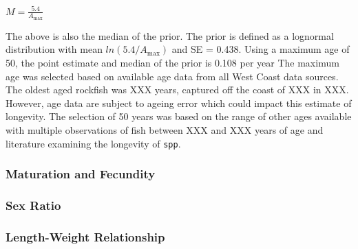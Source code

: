 \documentclass[11pt,
  english,
  a4paper,
]{article}
\begin{document}
\leavevmode\tagmcend\tagstructend\par

\begin{centering}

$M=\frac{5.4}{A_{\text{max}}}$

\end{centering}


The above is also the median of the prior. The prior is defined as a lognormal distribution with mean {\(ln(5.4/A_{\text{max}})\)\leavevmode\tagmcend\tagstructend} and SE = 0.438. Using a maximum age of 50, the point estimate and median of the prior is 0.108 per year The maximum age was selected based on available age data from all West Coast data sources. The oldest aged rockfish was XXX years, captured off the coast of XXX in XXX. However, age data are subject to ageing error which could impact this estimate of longevity. The selection of 50 years was based on the range of other ages available with multiple observations of fish between XXX and XXX years of age and literature examining the longevity of \texttt{spp}.

\leavevmode\tagmcend\tagstructend\par


\hypertarget{maturation-and-fecundity}{%
\subsubsection{Maturation and Fecundity}\label{maturation-and-fecundity}}

\leavevmode\tagmcend\tagstructend


\hypertarget{sex-ratio}{%
\subsubsection{Sex Ratio}\label{sex-ratio}}

\leavevmode\tagmcend\tagstructend


\hypertarget{length-weight-relationship}{%
\subsubsection{Length-Weight Relationship}\label{length-weight-relationship}}
\end{document}
